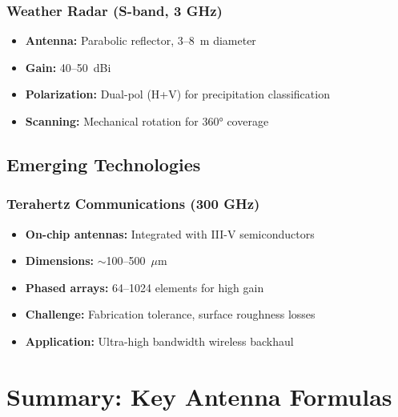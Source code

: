 \subsubsection{Weather Radar (S-band, 3 GHz)}
\begin{itemize}
\item \textbf{Antenna:} Parabolic reflector, 3--8~m diameter
\item \textbf{Gain:} 40--50~dBi
\item \textbf{Polarization:} Dual-pol (H+V) for precipitation classification
\item \textbf{Scanning:} Mechanical rotation for 360$°$ coverage
\end{itemize}

\subsection{Emerging Technologies}

\subsubsection{Terahertz Communications (300 GHz)}
\begin{itemize}
\item \textbf{On-chip antennas:} Integrated with III-V semiconductors
\item \textbf{Dimensions:} $\sim$100--500~$\mu$m
\item \textbf{Phased arrays:} 64--1024 elements for high gain
\item \textbf{Challenge:} Fabrication tolerance, surface roughness losses
\item \textbf{Application:} Ultra-high bandwidth wireless backhaul
\end{itemize}

\section{Summary: Key Antenna Formulas}

